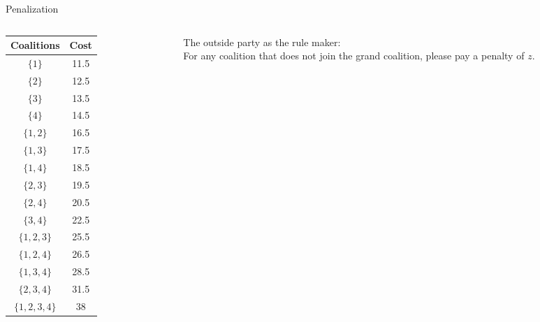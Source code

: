 \documentclass[14pt]{beamer}
\begin{document}
\begin{frame}{Penalization}
\small
\vspace{-4mm}
\begin{columns}
\begin{column}{4.5cm}
\begin{table}[H]
\centering
\tabcolsep=8pt
\footnotesize
\renewcommand\arraystretch{1.1}
\vspace{-3mm}
\begin{tabular}[!h]{c c }
\hline
\multicolumn{1}{c}{Coalitions} &\multicolumn{1}{c}{Cost}\\
\hline
$\{1\}$		&11.5	\\

$\{2\}$		&12.5	\\

$\{3\}$		&13.5	\\

$\{4\}$		&14.5  \\

$\{1,2\}$		&16.5	\\

$\{1,3\}$		&17.5	\\

$\{1,4\}$		&18.5	\\

$\{2,3\}$		&19.5	\\

$\{2,4\}$		&20.5	\\

$\{3,4\}$		&22.5	\\

$\{1,2,3\}$		&25.5	\\

$\{1,2,4\}$		&26.5	\\

$\{1,3,4\}$		&28.5	\\

$\{2,3,4\}$		&31.5	\\

$\{1,2,3,4\}$	&38	\\
\hline
\end{tabular}
\end{table}
\end{column}

\begin{column}{7cm}
\small
The outside party as the rule maker:\\
\vspace{1em}
\footnotesize
For any coalition that does not join the grand coalition, please pay a penalty of $z$.


\end{column}
\end{columns}
\end{frame}
\end{document}
